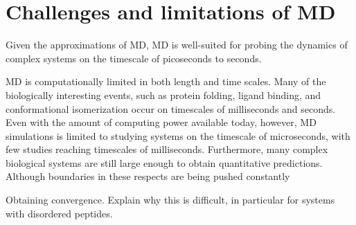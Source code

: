 


\section{Challenges and limitations of MD}

Given the approximations of MD, MD is well-suited for probing the dynamics of complex systems on the timescale of picoseconds to seconds.

MD is computationally limited in both length and time scales. Many of the biologically interesting events, such as protein folding, ligand binding, and conformational isomerization occur on timescales of milliseconds and seconds.  Even with the amount of computing power available today, however, MD simulations is limited to studying systems on the timescale of microseconds, with few studies reaching timescales of milliseconds. Furthermore, many complex biological systems are still large enough to obtain quantitative predictions. Although boundaries in these respects are being pushed constantly\cite{DE Shaw, Chris Neale, Sarah}

Obtaining convergence. Explain why this is difficult, in particular for systems with disordered peptides.			


